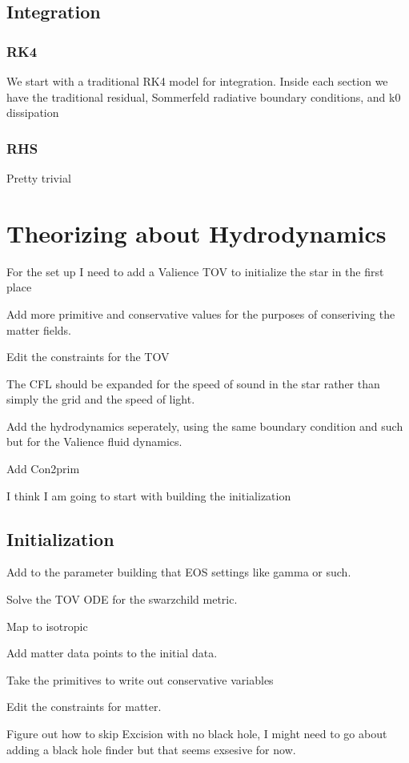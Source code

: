 \subsection{Integration}
\subsubsection{RK4}
We start with a traditional RK4 model for integration. Inside each section we have the traditional residual, Sommerfeld radiative boundary conditions, and k0 dissipation

\subsubsection{RHS}

Pretty trivial

\section{Theorizing about Hydrodynamics}

For the set up I need to add a Valience TOV to initialize the star in the first place


Add more primitive and conservative values for the purposes of conseriving the matter fields.

Edit the constraints for the TOV

The CFL should be expanded for the speed of sound in the star rather than simply the grid and the speed of light.

Add the hydrodynamics seperately, using the same boundary condition and such but for the Valience fluid dynamics.

Add Con2prim

I think I am going to start with building the initialization
\subsection{Initialization}

Add to the parameter building that EOS settings like gamma or such.

Solve the TOV ODE for the swarzchild metric.

Map to isotropic

Add matter data points to the initial data.

Take the primitives to write out conservative variables

Edit the constraints for matter.

Figure out how to skip Excision with no black hole, I might need to go about adding a black hole finder but that seems exsesive for now.


